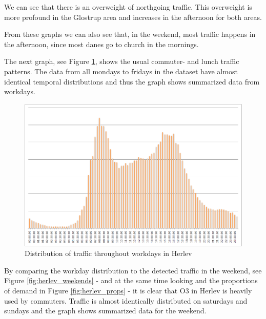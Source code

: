 We can see that there is an overweight of northgoing traffic. This overweight is more profound in the Glostrup area and increases in the afternoon for both areas.

From these graphs we can also see that, in the weekend, most traffic happens in the afternoon, since most danes go to church in the mornings.

The next graph, see Figure \ref{fig:herlev_commuter}, shows the usual commuter- and lunch traffic patterns. The data from all mondays to fridays in the dataset have almost identical temporal distributions and thus the graph shows summarized data from workdays.

\begin{figure}[!ht]
\begin{center}
\includegraphics[scale=0.4]{herlev_workday_distribution.png} 
\end{center}
\caption{Distribution of traffic throughout workdays in Herlev}
\label{fig:herlev_commuter}
\end{figure}

By comparing the workday distribution to the detected traffic in the weekend, see Figure \ref{fig:herlev_weekends} - and at the same time looking and the proportions of demand in Figure \ref{fig:herlev_props} - it is clear that O3 in Herlev is heavily used by commuters. Traffic is almost identically distributed on saturdays and sundays and the graph shows summarized data for the weekend.

